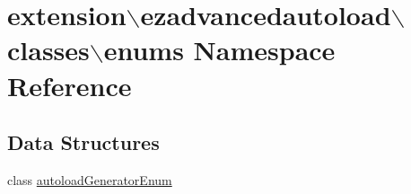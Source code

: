 \hypertarget{namespaceextension_1_1ezadvancedautoload_1_1classes_1_1enums}{\section{extension$\backslash$ezadvancedautoload$\backslash$classes$\backslash$enums Namespace Reference}
\label{namespaceextension_1_1ezadvancedautoload_1_1classes_1_1enums}
}
\subsection*{Data Structures}
\begin{DoxyCompactItemize}
\item 
class \hyperlink{classextension_1_1ezadvancedautoload_1_1classes_1_1enums_1_1autoload_generator_enum}{autoload\-Generator\-Enum}
\end{DoxyCompactItemize}

